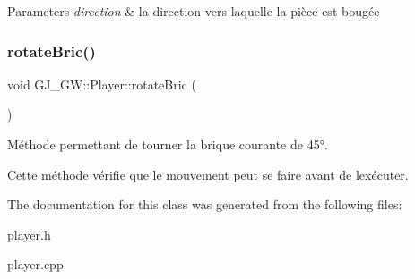 \begin{DoxyParams}{Parameters}
{\em direction} & la direction vers laquelle la pièce est bougée \\
\hline
\end{DoxyParams}
\hypertarget{class_g_j___g_w_1_1_player_a787190e4f8dcff9242ea361c237cf6d0}{}\label{class_g_j___g_w_1_1_player_a787190e4f8dcff9242ea361c237cf6d0} 
\subsubsection{\texorpdfstring{rotate\+Bric()}{rotateBric()}}
{\footnotesize\ttfamily void G\+J\+\_\+\+G\+W\+::\+Player\+::rotate\+Bric (\begin{DoxyParamCaption}{ }\end{DoxyParamCaption})}



Méthode permettant de tourner la brique courante de 45°. 

Cette méthode vérifie que le mouvement peut se faire avant de l\textquotesingle{}exécuter. 

The documentation for this class was generated from the following files\+:\begin{DoxyCompactItemize}
\item 
player.\+h\item 
player.\+cpp\end{DoxyCompactItemize}
